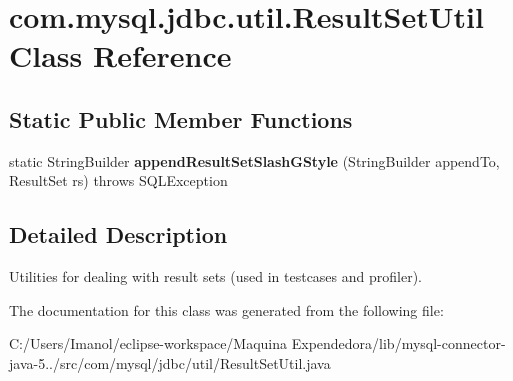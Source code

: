 \hypertarget{classcom_1_1mysql_1_1jdbc_1_1util_1_1_result_set_util}{}\section{com.\+mysql.\+jdbc.\+util.\+Result\+Set\+Util Class Reference}
\label{classcom_1_1mysql_1_1jdbc_1_1util_1_1_result_set_util}
\subsection*{Static Public Member Functions}
\begin{DoxyCompactItemize}
\item 
\mbox{\label{classcom_1_1mysql_1_1jdbc_1_1util_1_1_result_set_util_aa95b5f37f650f63d9bba6101262aa3f2}} 
static String\+Builder {\bfseries append\+Result\+Set\+Slash\+G\+Style} (String\+Builder append\+To, Result\+Set rs)  throws S\+Q\+L\+Exception 
\end{DoxyCompactItemize}


\subsection{Detailed Description}
Utilities for dealing with result sets (used in testcases and profiler). 

The documentation for this class was generated from the following file\+:\begin{DoxyCompactItemize}
\item 
C\+:/\+Users/\+Imanol/eclipse-\/workspace/\+Maquina Expendedora/lib/mysql-\/connector-\/java-\/5../src/com/mysql/jdbc/util/Result\+Set\+Util.\+java\end{DoxyCompactItemize}
